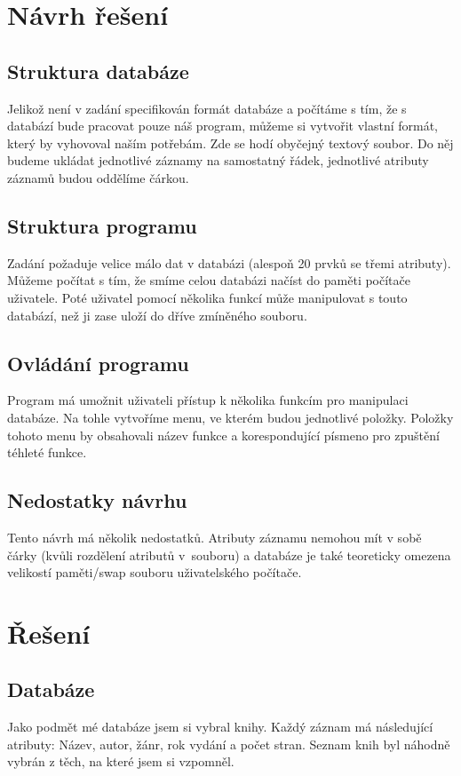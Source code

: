\chapter{Návrh řešení}
\section{Struktura databáze}
Jelikož není v zadání specifikován formát databáze a počítáme s tím, že s databází 
bude pracovat pouze náš program, můžeme si vytvořit vlastní formát, který by vyhovoval naším potřebám. 
Zde se hodí obyčejný textový soubor. Do něj budeme ukládat jednotlivé záznamy 
na samostatný řádek, jednotlivé atributy záznamů budou oddělíme čárkou.
\section{Struktura programu}
Zadání požaduje velice málo dat v databázi (alespoň 20 prvků se třemi atributy). 
Můžeme počítat s tím, že smíme celou databázi načíst do paměti počítače uživatele. 
Poté uživatel pomocí několika funkcí může manipulovat s touto databází, než ji zase uloží do dříve 
zmíněného souboru.
\section{Ovládání programu}
Program má umožnit uživateli přístup k několika funkcím pro manipulaci databáze. 
Na tohle vytvoříme menu, ve kterém budou jednotlivé položky. Položky tohoto
menu by obsahovali název funkce a korespondující písmeno pro zpuštění téhleté funkce.
\section{Nedostatky návrhu}
Tento návrh má několik nedostatků. Atributy záznamu nemohou mít v sobě čárky (kvůli rozdělení atributů 
v~souboru) a databáze je také teoreticky omezena velikostí paměti/swap souboru uživatelského počítače. 
\chapter{Řešení}
\section{Databáze}
Jako podmět mé databáze jsem si vybral knihy. Každý záznam má následující atributy: 
Název, autor, žánr, rok vydání a počet stran. Seznam knih byl náhodně vybrán z těch, na které 
jsem si vzpomněl.

